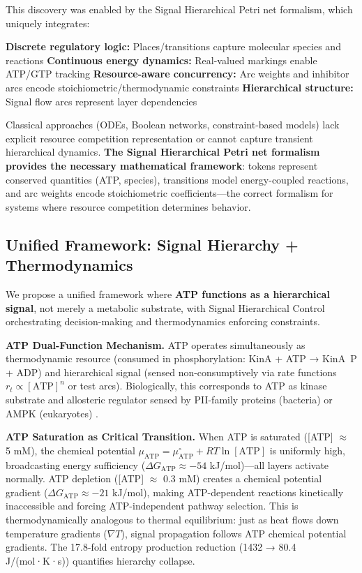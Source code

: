 \documentclass[twocolumn,11pt]{article}
\begin{document}
This discovery was enabled by the Signal Hierarchical Petri net formalism, which uniquely integrates:


\textbf{Discrete regulatory logic:} Places/transitions capture molecular species and reactions
\textbf{Continuous energy dynamics:} Real-valued markings enable ATP/GTP tracking
\textbf{Resource-aware concurrency:} Arc weights and inhibitor arcs encode stoichiometric/thermodynamic constraints \citep{qian2005,slepchenko2003,koch2011}
\textbf{Hierarchical structure:} Signal flow arcs represent layer dependencies


Classical approaches (ODEs, Boolean networks, constraint-based models) lack explicit resource competition representation or cannot capture transient hierarchical dynamics. \textbf{The Signal Hierarchical Petri net formalism provides the necessary mathematical framework}: tokens represent conserved quantities (ATP, species), transitions model energy-coupled reactions, and arc weights encode stoichiometric coefficients—the correct formalism for systems where resource competition determines behavior.

\subsection{Unified Framework: Signal Hierarchy + Thermodynamics}

We propose a unified framework where \textbf{ATP functions as a hierarchical signal}, not merely a metabolic substrate, with Signal Hierarchical Control orchestrating decision-making and thermodynamics enforcing constraints.

\textbf{ATP Dual-Function Mechanism.} ATP operates simultaneously as thermodynamic resource (consumed in phosphorylation: KinA + ATP → KinA~P + ADP) and hierarchical signal (sensed non-consumptively via rate functions $r_t \propto [\text{ATP}]^n$ or test arcs). Biologically, this corresponds to ATP as kinase substrate and allosteric regulator sensed by PII-family proteins (bacteria) or AMPK (eukaryotes) \citep{ninfa2000,hardie2012}.

\textbf{ATP Saturation as Critical Transition.} When ATP is saturated ([ATP] $\approx$ 5 mM), the chemical potential $\mu_{\text{ATP}} = \mu^{\circ}_{\text{ATP}} + RT \ln[\text{ATP}]$ is uniformly high, broadcasting energy sufficiency ($\Delta G_{\text{ATP}} \approx -54$ kJ/mol)—all layers activate normally. ATP depletion ([ATP] $\approx$ 0.3 mM) creates a chemical potential gradient ($\Delta G_{\text{ATP}} \approx -21$ kJ/mol), making ATP-dependent reactions kinetically inaccessible and forcing ATP-independent pathway selection. This is thermodynamically analogous to thermal equilibrium: just as heat flows down temperature gradients ($\nabla T$), signal propagation follows ATP chemical potential gradients. The 17.8-fold entropy production reduction (1432 → 80.4 J/(mol·K·s)) quantifies hierarchy collapse.
\end{document}
